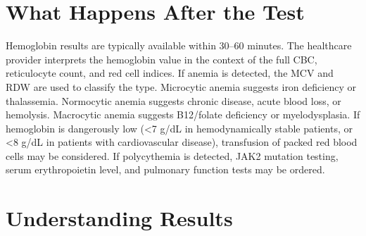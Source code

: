 \section*{What Happens After the Test}
Hemoglobin results are typically available within 30--60 minutes. The healthcare provider interprets the hemoglobin value in the context of the full CBC, reticulocyte count, and red cell indices. If anemia is detected, the MCV and RDW are used to classify the type. Microcytic anemia suggests iron deficiency or thalassemia. Normocytic anemia suggests chronic disease, acute blood loss, or hemolysis. Macrocytic anemia suggests B12/folate deficiency or myelodysplasia. If hemoglobin is dangerously low (<7 g/dL in hemodynamically stable patients, or <8 g/dL in patients with cardiovascular disease), transfusion of packed red blood cells may be considered. If polycythemia is detected, JAK2 mutation testing, serum erythropoietin level, and pulmonary function tests may be ordered.

\section*{Understanding Results}

